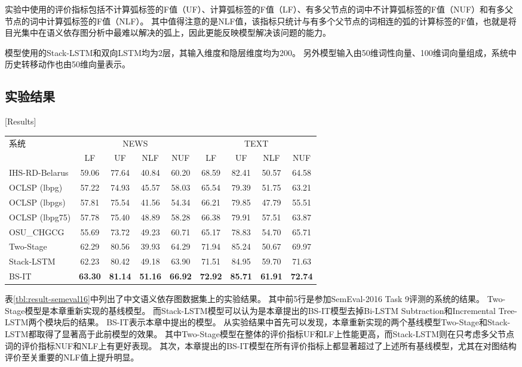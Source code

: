 实验中使用的评价指标包括不计算弧标签的F值（UF）、计算弧标签的F值（LF）、有多父节点的词中不计算弧标签的F值（NUF）和有多父节点的词中计算弧标签的F值（NLF）。
其中值得注意的是NLF值，该指标只统计与有多个父节点的词相连的弧的计算标签的F值，也就是将目光集中在语义依存图分析中最难以解决的弧上，因此更能反映模型解决该问题的能力。

模型使用的Stack-LSTM和双向LSTM均为2层，其输入维度和隐层维度均为200。
另外模型输入由50维词性向量、100维词向量组成，系统中历史转移动作也由50维向量表示。

\subsection{实验结果}[Results]

\begin{table}[htpb]
    \vspace{0.5em}\centering\wuhao
	\begin{tabular}{lcccccccc}
		\toprule[1.5pt]
		\multirow{2}{*}{ 系统}&\multicolumn{4}{c}{NEWS}&\multicolumn{4}{c}{TEXT}\\
		\cmidrule(r){2-5} \cmidrule(r){6-9}
		& LF& UF& NLF& NUF& LF& UF& NLF& NUF\\
		\midrule[1pt]
		IHS-RD-Belarus&59.06&77.64&40.84&60.20&68.59&82.41&50.57&64.58\\
		OCLSP (lbpg)&57.22&74.93&45.57&58.03&65.54&79.39&51.75&63.21\\
		OCLSP (lbpgs)&57.81&75.54&41.56&54.34&66.21&79.85&47.79&55.51\\
		OCLSP (lbpg75)&57.78&75.40&48.89&58.28&66.38&79.91&57.51&63.87\\
		OSU\_CHGCG&55.69&73.72&49.23&60.71&65.17&78.83&54.70&65.71\\
		Two-Stage & 62.29&80.56&39.93&64.29&71.94&85.24&50.67&69.97 \\ 
		Stack-LSTM &62.23&80.42&49.18&63.90&71.51&84.95&59.70&71.63\\
		BS-IT &\bf63.30&\bf81.14&\bf51.16&\bf66.92&\bf72.92&\bf85.71&\bf61.91&\bf72.74\\
		\bottomrule[1.5pt]
	\end{tabular}
\end{table}

表\ref{tbl:result-semeval16}中列出了中文语义依存图数据集上的实验结果。
其中前5行是参加SemEval-2016 Task 9评测的系统的结果。
Two-Stage模型是本章重新实现的基线模型。
而Stack-LSTM模型可以认为是本章提出的BS-IT模型去掉Bi-LSTM Subtraction和Incremental Tree-LSTM两个模块后的结果。
BS-IT表示本章中提出的模型。
从实验结果中首先可以发现，本章重新实现的两个基线模型Two-Stage和Stack-LSTM都取得了显著高于此前模型的效果。
其中Two-Stage模型在整体的评价指标UF和LF上性能更高，而Stack-LSTM则在只考虑多父节点词的评价指标NUF和NLF上有更好表现。
其次，本章提出的BS-IT模型在所有评价指标上都显著超过了上述所有基线模型，尤其在对图结构评价至关重要的NLF值上提升明显。

